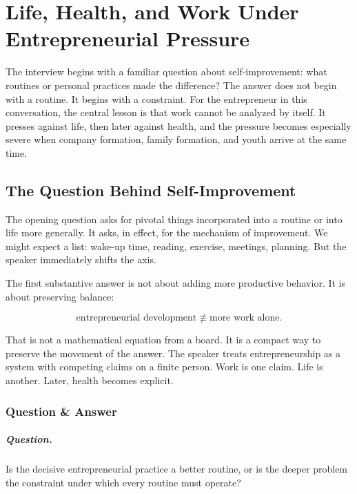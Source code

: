 \chapter{Life, Health, and Work Under Entrepreneurial Pressure}

The interview begins with a familiar question about self-improvement: what routines or personal practices made the difference? The answer does not begin with a routine. It begins with a constraint. For the entrepreneur in this conversation, the central lesson is that work cannot be analyzed by itself. It presses against life, then later against health, and the pressure becomes especially severe when company formation, family formation, and youth arrive at the same time.

\section{The Question Behind Self-Improvement}

The opening question asks for pivotal things incorporated into a routine or into life more generally. It asks, in effect, for the mechanism of improvement. We might expect a list: wake-up time, reading, exercise, meetings, planning. But the speaker immediately shifts the axis.

The first substantive answer is not about adding more productive behavior. It is about preserving balance:

\begin{equation}
\text{entrepreneurial development}
\not\equiv
\text{more work alone}.
\end{equation}

That is not a mathematical equation from a board. It is a compact way to preserve the movement of the answer. The speaker treats entrepreneurship as a system with competing claims on a finite person. Work is one claim. Life is another. Later, health becomes explicit.

\subsection{Question \& Answer}

\paragraph{Question.}
Is the decisive entrepreneurial practice a better routine, or is the deeper problem the constraint under which every routine must operate?

